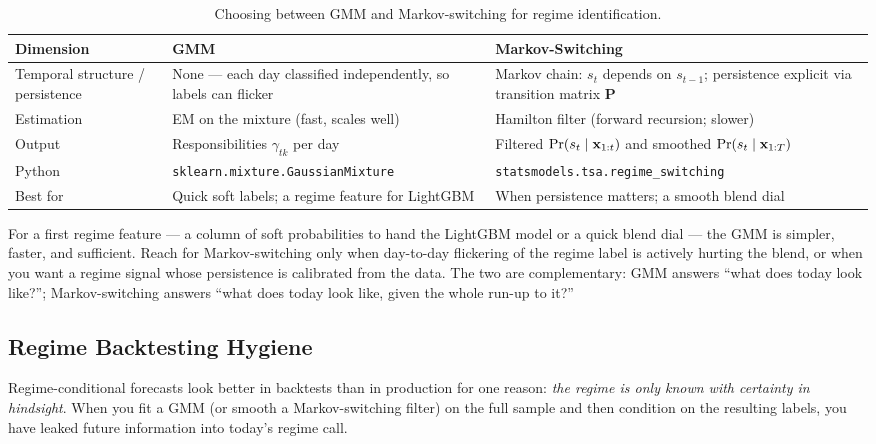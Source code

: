 \begin{table}[htbp]
\centering
\caption{Choosing between GMM and Markov-switching for regime
  identification.}
\label{tab:hybrid:gmm-vs-ms}
\small
\begin{tabular}{@{}p{3.0cm}p{4.5cm}p{4.5cm}@{}}
\toprule
\textbf{Dimension} & \textbf{GMM} & \textbf{Markov-Switching} \\
\midrule
Temporal structure / persistence
  & None --- each day classified independently, so labels can flicker
  & Markov chain: $s_t$ depends on $s_{t-1}$; persistence explicit via
    transition matrix $\mathbf{P}$ \\
\addlinespace
Estimation
  & EM on the mixture (fast, scales well)
  & Hamilton filter (forward recursion; slower) \\
\addlinespace
Output
  & Responsibilities $\gamma_{tk}$ per day
  & Filtered $\Pr(s_t \mid \mathbf{x}_{1:t})$ and smoothed
    $\Pr(s_t \mid \mathbf{x}_{1:T})$ \\
\addlinespace
Python
  & \texttt{sklearn.mixture.GaussianMixture}
  & \texttt{statsmodels.tsa.regime\_switching} \\
\addlinespace
Best for
  & Quick soft labels; a regime feature for LightGBM
  & When persistence matters; a smooth blend dial \\
\bottomrule
\end{tabular}
\end{table}

\begin{keyidea}
For a first regime feature --- a column of soft probabilities to hand the
LightGBM model or a quick blend dial --- the GMM is simpler, faster, and
sufficient.  Reach for Markov-switching only when day-to-day flickering of
the regime label is actively hurting the blend, or when you want a regime
signal whose persistence is calibrated from the data.  The two are
complementary: GMM answers ``what does today look like?''; Markov-switching
answers ``what does today look like, given the whole run-up to it?''
\end{keyidea}

\subsection{Regime Backtesting Hygiene}
\label{sec:hybrid:regime-hygiene}

Regime-conditional forecasts look better in backtests than in production
for one reason: \emph{the regime is only known with certainty in
hindsight}.  When you fit a GMM (or smooth a Markov-switching filter) on
the full sample and then condition on the resulting labels, you have leaked
future information into today's regime call.

